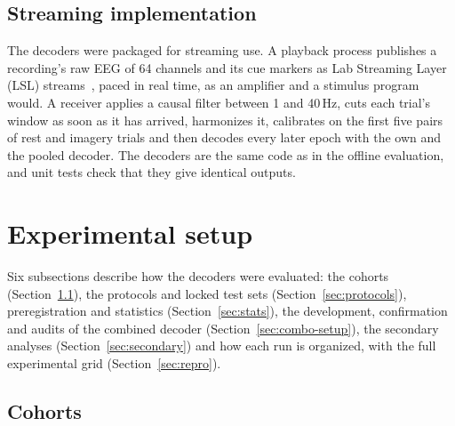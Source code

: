 \documentclass{ieeeaccess}
\begin{document}
\subsection{Streaming implementation}\label{sec:stream}

The decoders were packaged for streaming use. A playback process publishes a recording's raw EEG of 64 channels and its cue markers as Lab Streaming Layer (LSL) streams~\cite{kothe2025}, paced in real time, as an amplifier and a stimulus program would. A receiver applies a causal filter between 1 and 40\,Hz, cuts each trial's window as soon as it has arrived, harmonizes it, calibrates on the first five pairs of rest and imagery trials and then decodes every later epoch with the own and the pooled decoder. The decoders are the same code as in the offline evaluation, and unit tests check that they give identical outputs.

\section{Experimental setup}\label{sec:setup}

Six subsections describe how the decoders were evaluated: the cohorts (Section~\ref{sec:cohorts}), the protocols and locked test sets (Section~\ref{sec:protocols}), preregistration and statistics (Section~\ref{sec:stats}), the development, confirmation and audits of the combined decoder (Section~\ref{sec:combo-setup}), the secondary analyses (Section~\ref{sec:secondary}) and how each run is organized, with the full experimental grid (Section~\ref{sec:repro}).

\subsection{Cohorts}\label{sec:cohorts}
\end{document}
